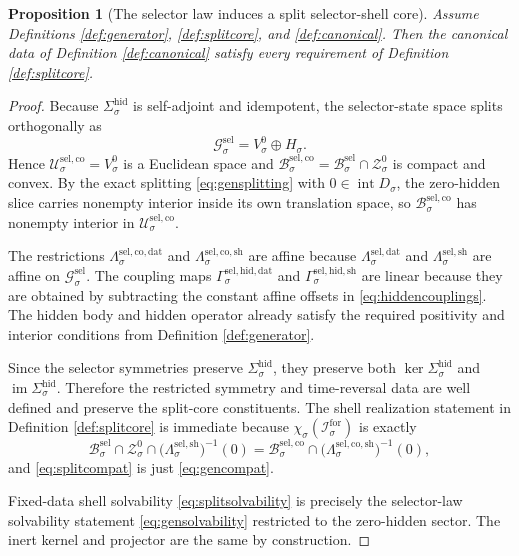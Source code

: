 \documentclass[11pt]{article}
\newcommand{\ForSpace}[1]{\mathcal I_{#1}^{\mathrm{for}}}
\newcommand{\GenSpace}[1]{\mathcal G_{#1}^{\mathrm{sel}}}
\newcommand{\GenBody}[1]{\mathcal B_{#1}^{\mathrm{sel}}}
\newcommand{\GenData}[1]{\Lambda_{#1}^{\mathrm{sel,dat}}}
\newcommand{\GenShell}[1]{\Lambda_{#1}^{\mathrm{sel,sh}}}
\newcommand{\HiddenSel}[1]{\Sigma_{#1}^{\mathrm{hid}}}
\newcommand{\ZeroHiddenSlice}[1]{\mathcal Z_{#1}^{0}}
\newcommand{\ZeroHiddenVec}[1]{V_{#1}^{0}}
\newcommand{\GapSpace}[1]{H_{#1}}
\newcommand{\GapBody}[1]{D_{#1}}
\newcommand{\GenEmbed}[1]{\chi_{#1}}
\newcommand{\SelCoreSpace}[1]{\mathcal U_{#1}^{\mathrm{sel,co}}}
\newcommand{\SelCoreBody}[1]{\mathcal B_{#1}^{\mathrm{sel,co}}}
\newcommand{\SelCoreData}[1]{\Lambda_{#1}^{\mathrm{sel,co,dat}}}
\newcommand{\SelCoreShell}[1]{\Lambda_{#1}^{\mathrm{sel,co,sh}}}
\newcommand{\SelHiddenData}[1]{\Gamma_{#1}^{\mathrm{sel,hid,dat}}}
\newcommand{\SelHiddenShell}[1]{\Gamma_{#1}^{\mathrm{sel,hid,sh}}}
\newtheorem{proposition}{Proposition}
\begin{document}
\begin{proposition}[The selector law induces a split selector-shell core]
\label{prop:induced}
Assume Definitions \ref{def:generator}, \ref{def:splitcore}, and \ref{def:canonical}. Then the canonical data of Definition \ref{def:canonical} satisfy every requirement of Definition \ref{def:splitcore}.
\end{proposition}

\begin{proof}
Because \(\HiddenSel{\sigma}\) is self-adjoint and idempotent, the selector-state space splits orthogonally as
\[
\GenSpace{\sigma}
=
\ZeroHiddenVec{\sigma}\oplus\GapSpace{\sigma}.
\]
Hence \(\SelCoreSpace{\sigma}=\ZeroHiddenVec{\sigma}\) is a Euclidean space and \(\SelCoreBody{\sigma}=\GenBody{\sigma}\cap\ZeroHiddenSlice{\sigma}\) is compact and convex. By the exact splitting \eqref{eq:gensplitting} with \(0\in\operatorname{int}\GapBody{\sigma}\), the zero-hidden slice carries nonempty interior inside its own translation space, so \(\SelCoreBody{\sigma}\) has nonempty interior in \(\SelCoreSpace{\sigma}\).

The restrictions \(\SelCoreData{\sigma}\) and \(\SelCoreShell{\sigma}\) are affine because \(\GenData{\sigma}\) and \(\GenShell{\sigma}\) are affine on \(\GenSpace{\sigma}\). The coupling maps \(\SelHiddenData{\sigma}\) and \(\SelHiddenShell{\sigma}\) are linear because they are obtained by subtracting the constant affine offsets in \eqref{eq:hiddencouplings}. The hidden body and hidden operator already satisfy the required positivity and interior conditions from Definition \ref{def:generator}.

Since the selector symmetries preserve \(\HiddenSel{\sigma}\), they preserve both \(\ker\HiddenSel{\sigma}\) and \(\operatorname{im}\HiddenSel{\sigma}\). Therefore the restricted symmetry and time-reversal data are well defined and preserve the split-core constituents. The shell realization statement in Definition \ref{def:splitcore} is immediate because \(\GenEmbed{\sigma}(\ForSpace{\sigma})\) is exactly
\[
\GenBody{\sigma}\cap\ZeroHiddenSlice{\sigma}\cap
\bigl(\GenShell{\sigma}\bigr)^{-1}(0)
=
\SelCoreBody{\sigma}\cap
\bigl(\SelCoreShell{\sigma}\bigr)^{-1}(0),
\]
and \eqref{eq:splitcompat} is just \eqref{eq:gencompat}.

Fixed-data shell solvability \eqref{eq:splitsolvability} is precisely the selector-law solvability statement \eqref{eq:gensolvability} restricted to the zero-hidden sector. The inert kernel and projector are the same by construction.


\end{proof}
\end{document}
